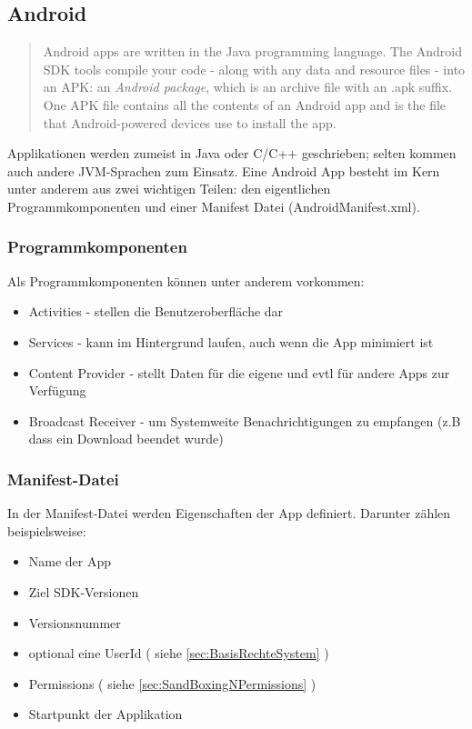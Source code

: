 \subsection{Android}\label{sec:app-android}
	\begin{quote}
	Android apps are written in the Java programming language. The Android SDK tools compile your code - along with any data and resource files - into an APK: an \textit{Android package}, which is an archive file with an .apk suffix. One APK file contains all the contents of an Android app and is the file that Android-powered devices use to install the app.\cite{AndroidApp}
	\end{quote}
	
\begin{flushleft}
	Applikationen werden zumeist in Java oder C/C++ geschrieben; selten kommen auch andere JVM-Sprachen zum Einsatz.
	Eine Android App besteht im Kern unter anderem aus zwei wichtigen Teilen: den eigentlichen Programmkomponenten und einer Manifest Datei (AndroidManifest.xml).\\
\end{flushleft}
	\subsubsection{Programmkomponenten}
	Als Programmkomponenten können unter anderem vorkommen:
	\begin{itemize}\itemsep0pt
		\item Activities - stellen die Benutzeroberfläche dar
		\item Services - kann im Hintergrund laufen, auch wenn die App minimiert ist
		\item Content Provider - stellt Daten für die eigene und evtl für andere Apps zur Verfügung
		\item Broadcast Receiver - um Systemweite Benachrichtigungen zu empfangen (z.B dass ein Download beendet wurde)
	\end{itemize}
	\subsubsection{Manifest-Datei}
	In der Manifest-Datei werden Eigenschaften der App definiert. Darunter zählen beispielsweise:
	\begin{itemize}\itemsep0pt
		\item Name der App
		\item Ziel SDK-Versionen
		\item Versionsnummer
		\item optional eine UserId ( siehe \ref*{sec:BasisRechteSystem} )
		\item Permissions ( siehe \ref*{sec:SandBoxingNPermissions} )
		\item Startpunkt der Applikation
	\end{itemize}
